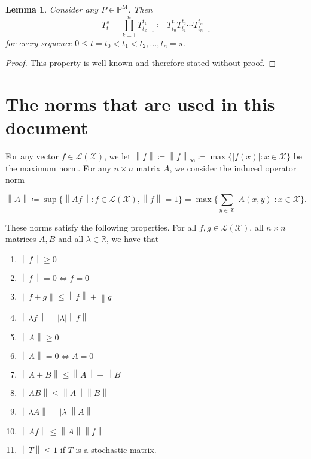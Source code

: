 \documentclass[a4paper,reqno]{amsart}
\newtheorem{lemma}[theorem]{Lemma}
\newcommand{\reals}{\mathbb{R}}
\newcommand{\states}{\mathcal{X}}
\newcommand{\processes}{\mathbb{P}}
\newcommand{\mprocesses}{\processes^{\mathrm{M}}}
\newcommand{\gambles}{\mathcal{L}}
\newcommand{\gamblesX}{\gambles(\states)}
\newcommand{\asa}{\Leftrightarrow}
\newcommand{\norm}[1]{\left\lVert #1 \right\rVert}
\newcommand{\abs}[1]{\left\vert #1 \right\vert}
\begin{document}
\begin{lemma}\label{lemma:transitionmatrixfactorises}
Consider any $P\in\mprocesses$. Then
\begin{equation*}
T_t^s=\prod_{k=1}^n T_{t_{k-1}}^{t_k} \coloneqq T_{t_0}^{t_1}T_{t_1}^{t_2}\cdots T_{t_{n-1}}^{t_n}
\end{equation*}
for every sequence $0\leq t=t_0<t_1<t_2,\dots,t_{n}=s$.
\end{lemma}
\begin{proof}
This property is well known and therefore stated without proof.
\end{proof}

\section{The norms that are used in this document}

For any vector $f\in\gamblesX$, we let $\norm{f}\coloneqq\norm{f}_{\infty}\coloneqq\max\{\abs {f(x)}\colon x\in\states\}$ be the maximum norm. For any $n\times n$ matrix $A$, we consider the induced operator norm

\begin{equation*}
\norm{A}\coloneqq\sup\{\norm{Af}\colon f\in\gamblesX,\norm{f}=1\}
=
\max\{\sum_{y\in\states}\abs{A(x,y)}\colon x\in\states\}.
\end{equation*}

\noindent
These norms satisfy the following properties. For all $f,g\in\gamblesX$, all $n\times n$ matrices $A,B$ and all $\lambda\in\reals$, we have that
\vspace{5pt}

\begin{enumerate}[label=N\arabic*:]
\item
$\norm{f}\geq0$
\item
$\norm{f}=0\asa f=0$
\item
$\norm{f+g}\leq\norm{f}+\norm{g}$
\item
$\norm{\lambda f}=\abs{\lambda}\norm{f}$
\item
$\norm{A}\geq0$
\item
$\norm{A}=0\asa A=0$
\item
$\norm{A+B}\leq\norm{A}+\norm{B}$
\item
$\norm{AB}\leq\norm{A}\norm{B}$
\item
$\norm{\lambda A}=\abs{\lambda}\norm{A}$
\item
$\norm{Af}\leq\norm{A}\norm{f}$
\item
$\norm{T}\leq 1$ if $T$ is a stochastic matrix.
\end{enumerate}
\vspace{5pt}
\end{document}
